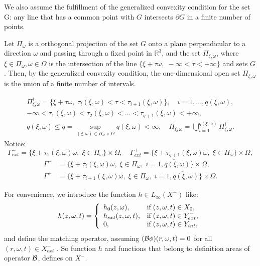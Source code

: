 \documentclass[12pt,reqno]{report}
\begin{document}
We also assume the fulfillment of the generalized convexity condition \cite{2,6} for the set {G}: any line that has a common point with $G$ intersects $\partial G$ in a finite number of points.

Let $\Pi_{\omega}$ is a orthogonal projection of the set $G$ onto a plane perpendicular to a direction $\omega $ and passing through a fixed point in $\mathbb{R}^3$, and the set $\Pi_{\xi,\omega} $, where $\xi \in \Pi_{\omega}, \omega \in \Omega $ is the intersection of the line $ \{\xi + \tau \omega, \; - \infty < \tau <+\infty \} $ and sets $G$. Then, by the generalized convexity condition, the one-dimensional open set $ \Pi_{\xi, \omega} $ is the union of a finite number of intervals.

\begin{equation}
\begin{array}{c}
\Pi^i_{\xi,\omega}=\{\xi + \tau \omega, \; \tau_i (\xi,\omega) < \tau
<
\tau_{i+1} (\xi,\omega) \}, \quad i=1,...,q(\xi,\omega), \\
- \infty < \tau_1(\xi,\omega) < \tau_2 (\xi,\omega) < ... <\tau_{q+1}
(\xi,\omega) < + \infty, \\
q(\xi,\omega) \leq \overline{q}= \sup \limits_{(\xi,\omega)\in
	\Pi_{\omega} \times \Omega} q(\xi,\omega) < \infty,\quad
\Pi_{\xi,\omega}= \bigcup \limits^{q(\xi,\omega)}_{i=1}
\Pi^i_{\xi,\omega}.
\end{array}
\end{equation}
Notice:
$$
\Gamma^{-}_{ext}= \{\xi + \tau_1(\xi,\omega) \omega, \; \xi \in
\Pi_{\omega} \} \times \Omega, \quad \Gamma^{+}_{ext}= \{\xi +
\tau_{q+1}(\xi,\omega) \omega, \; \xi \in \Pi_{\omega} \} \times
\Omega,
$$
$$
\begin{array}{rl}
\Gamma^{-}&= \{\xi + \tau_i(\xi,\omega) \omega, \; \xi \in
\Pi_{\omega},\; i=\overline{1,q(\xi,\omega)} \} \times \Omega,
\\
\Gamma^{+}&= \{\xi + \tau_{i+1}(\xi,\omega) \omega, \; \xi \in
\Pi_{\omega}, \;i=\overline{1,q(\xi,\omega)} \} \times \Omega.
\end{array}
$$

For convenience, we introduce the function $h \in L_{\infty}( X^{-})$ 
like:
$$
h(z,\omega,t)=\left\{%
\begin{array}{ll}
h_0(z,\omega), & \hbox{if} \; (z,\omega,t) \in X_0, \\
h_{ext}(z,\omega,t), & \hbox{if} \; (z,\omega,t) \in Y^-_{ext}, \\
0,                   & \hbox{if} \; (z,\omega,t) \in Y_{int}, \\
\end{array}%
\right.
$$
and define the matching operator, assuming $({\cal B} \phi) (r,\omega,t)=0$ for all $(r,\omega,t) \in X^-_{ext}$ .
So function $h$ and functions that belong to definition areas of operator ${\cal B}$, defines on $X^{-}$.
\end{document}
